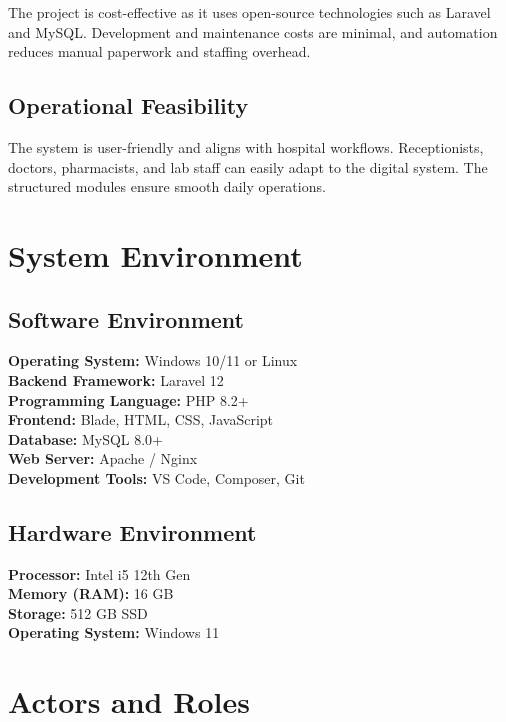 The project is cost-effective as it uses open-source technologies such as Laravel and MySQL. Development and maintenance costs are minimal, and automation reduces manual paperwork and staffing overhead.

\subsection{Operational Feasibility}

The system is user-friendly and aligns with hospital workflows. Receptionists, doctors, pharmacists, and lab staff can easily adapt to the digital system. The structured modules ensure smooth daily operations.

\section{System Environment}

\subsection{Software Environment}

\textbf{Operating System:} Windows 10/11 or Linux \\
\textbf{Backend Framework:} Laravel 12 \\
\textbf{Programming Language:} PHP 8.2+ \\
\textbf{Frontend:} Blade, HTML, CSS, JavaScript \\
\textbf{Database:} MySQL 8.0+ \\
\textbf{Web Server:} Apache / Nginx \\
\textbf{Development Tools:} VS Code, Composer, Git \\

\subsection{Hardware Environment}

\textbf{Processor:} Intel i5 12th Gen \\
\textbf{Memory (RAM):} 16 GB \\
\textbf{Storage:} 512 GB SSD \\
\textbf{Operating System:} Windows 11 \\

\section{Actors and Roles}

